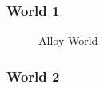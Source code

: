 
\subsubsection{World 1}

\begin{figure}[h] 

\begin{center}

\caption{Alloy World} 
\label{fig:alloyworld1} 


\end{center}
\end{figure} 

\subsubsection{World 2}

